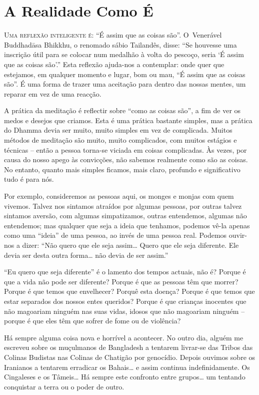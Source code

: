\chapter{A Realidade Como É}

\lettrine{U}{ma reflexão inteligente é:} ``É assim que as coisas são''. O~Venerável
Buddhadāsa Bhikkhu, o renomado sábio Tailandês, disse: ``Se houvesse uma
inscrição útil para se colocar num medalhão à volta do pescoço, seria `É assim
que as coisas são'.'' Esta reflexão ajuda-nos a contemplar: onde quer que
estejamos, em qualquer momento e lugar, bom ou mau, ``É assim que as coisas
são''. É uma forma de trazer uma aceitação para dentro das nossas mentes, um
reparar em vez de uma reacção.

A prática da meditação é reflectir sobre ``como as coisas são'', a fim de ver os
medos e desejos que criamos. Esta é uma prática bastante simples, mas a prática
do Dhamma devia ser muito, muito simples em vez de complicada. Muitos
métodos de meditação são muito, muito complicados, com muitos estágios e
técnicas -- então a pessoa torna-se viciada em coisas complicadas. Às vezes, por
causa do nosso apego às convicções, não sabemos realmente como são as coisas. No
entanto, quanto mais simples ficamos, mais claro, profundo e significativo tudo
é para nós.

Por exemplo, consideremos as pessoas aqui, os monges e monjas com quem vivemos.
Talvez nos sintamos atraídos por algumas pessoas, por outras talvez sintamos
aversão, com algumas simpatizamos, outras entendemos, algumas não entendemos;
mas qualquer que seja a ideia que tenhamos, podemos vê-la apenas como uma
``ideia'' de uma pessoa, ao invés de uma pessoa real. Podemos ouvir-nos a dizer:
``Não quero que ele seja assim\ldots{} Quero que ele seja diferente. Ele devia
ser desta outra forma\ldots{} não devia de ser assim.''

``Eu quero que seja diferente'' é o lamento dos tempos actuais, não é? Porque é
que a vida não pode ser diferente? Porque é que as pessoas têm que morrer?
Porque é que temos que envelhecer? Porquê esta doença? Porque é que temos que
estar separados dos nossos entes queridos? Porque é que crianças inocentes que
não magoariam ninguém nas suas vidas, idosos que não magoariam ninguém -- porque
é que eles têm que sofrer de fome ou de violência?

Há sempre alguma coisa nova e horrível a acontecer. No outro dia, alguém me
escreveu sobre os muçulmanos de Bangladesh a tentarem livrar-se das Tribos das
Colinas Budistas nas Colinas de Chatigão por genocídio. Depois ouvimos sobre os
Iranianos a tentarem erradicar os Bahais\ldots{} e assim continua
indefinidamente. Os Cingaleses e os Tâmeis\ldots{} Há sempre este confronto
entre grupos\ldots{} um tentando conquistar a terra ou o poder de outro.

